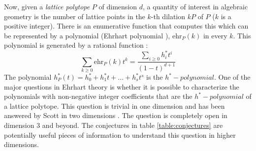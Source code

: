 Now, given a \textit{lattice polytope} $P$ of dimension $d$, a quantity of interest in algebraic geometry is the number of lattice points in the $k$-th dilation $kP$ of $P$ ($k$ is a positive integer).
There is an enumerative function that computes this which can be represented by a polynomial (Ehrhart polynomial \cite{ehrhart1962sur}), $\text{ehr}_P(k)$ in every $k$. This polynomial is generated by a rational function \cite{ballettiUniversalInequalitiesEhrhart2017}:
\begin{equation*}
    \sum_{k\geq 0}\text{ehr}_P(k)t^k = \frac{\sum_{i\geq 0}h^*_it^i}{(1-t)^{d+1}}  
\end{equation*}  
The polynomial $h^*_P(t) = h^*_0 + h^*_1t + ... + h^*_st^s$ is the $h^*-polynomial$. One of the major questions in Ehrhart theory is whether it is possible to characterize the polynomials with non-negative integer coefficients that are the $h^*-polynomial$ of a lattice polytope. This question is trivial in one dimension and has been answered by Scott in two dimensions \cite{Scott_1976}. The question is completely open in dimension 3 and beyond.
The conjectures in table \ref{table:conjectures} are potentially useful pieces of information to understand this question in higher dimensions.

